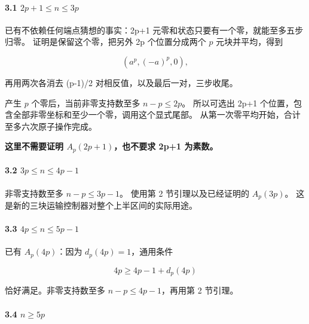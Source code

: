 \paragraph*{\texorpdfstring{{3.1} {\ensuremath{2p+1\le n\le 3p}}}{3.1 }}\label{C6-h36}

{已有不依赖任何端点猜想的事实：2p+1} {元零和状态只要有一个零，就能至多五步归零。} {证明是保留这个零，把另外} {2p} {个位置分成两个} {\ensuremath{p}} {元块并平均，得到}

\[
(a^p,(-a)^p,0),
\]

{再用两次各消去} {(p-1)/2} {对相反值，以及最后一对，三步收尾。}

{产生} {\ensuremath{p}} {个零后，当前非零支持数至多} {\ensuremath{n-p\le 2p}。} {所以可选出} {2p+1} {个位置，包含全部非零坐标和至少一个零，调用这个显式尾部。} {从第一次零平均开始，合计至多六次原子操作完成。}

\textbf{{这里不需要证明} {\ensuremath{A_{p}(2p+1)}，也不要求} {2p+1} {为素数。}}

\paragraph*{\texorpdfstring{{3.2} {\ensuremath{3p\le n\le 4p-1}}}{3.2 }}\label{C6-h37}

{非零支持数至多} {\ensuremath{n-p\le 3p-1}。} {使用第} {2} {节引理以及已经证明的} {\ensuremath{A_{p}(3p)}。} {这是新的三块运输控制器对整个上半区间的实际用途。}

\paragraph*{\texorpdfstring{{3.3} {\ensuremath{4p\le n\le 5p-1}}}{3.3 }}\label{C6-h38}

{已有} {\ensuremath{A_{p}(4p)}：因为} {\ensuremath{d_{p}(4p)=1}，通用条件}

\[
4p\ge4p-1+d_p(4p)
\]

{恰好满足。非零支持数至多} {\ensuremath{n-p\le 4p-1}，再用第} {2} {节引理。}

\paragraph*{\texorpdfstring{{3.4} {\ensuremath{n\ge 5p}}}{3.4 }}\label{C6-h39}

